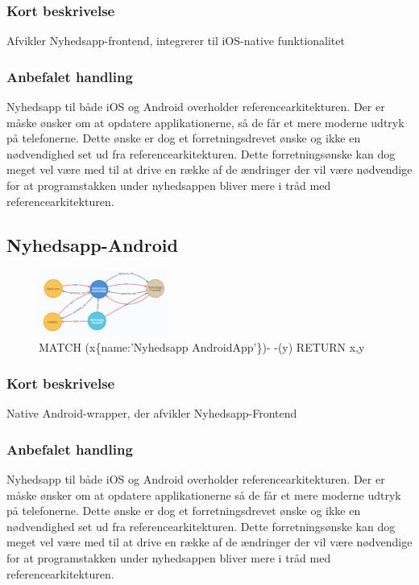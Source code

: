 \documentclass{article}
\begin{document}
\subsubsection{Kort beskrivelse}
Afvikler Nyhedsapp-frontend, integrerer til iOS-native funktionalitet
\subsubsection{Anbefalet handling}
Nyhedsapp til både iOS og Android overholder referencearkitekturen. Der er måske ønsker om at opdatere applikationerne, så de får et mere moderne udtryk på telefonerne. Dette ønske er dog et forretningsdrevet ønske og ikke en nødvendighed set ud fra referencearkitekturen. Dette forretningsønske kan dog meget vel være med til at drive en række af de ændringer der vil være nødvendige for at programstakken under nyhedsappen bliver mere i tråd med referencearkitekturen.


\subsection{Nyhedsapp-Android}
\begin{figure}[h]
\includegraphics[width=120pt]{Nyhedsapp-Android.PNG}
\caption{MATCH (x\{name:'Nyhedsapp AndroidApp'\})- -(y) RETURN x,y}
\end{figure}
\subsubsection{Kort beskrivelse}
Native Android-wrapper, der afvikler Nyhedsapp-Frontend
\subsubsection{Anbefalet handling}
Nyhedsapp til både iOS og Android overholder referencearkitekturen. Der er måske ønsker om at opdatere applikationerne så de får et mere moderne udtryk på telefonerne. Dette ønske er dog et forretningsdrevet ønske og ikke en nødvendighed set ud fra referencearkitekturen. Dette forretningsønske kan dog meget vel være med til at drive en række af de ændringer der vil være nødvendige for at programstakken under nyhedsappen bliver mere i tråd med referencearkitekturen.
\end{document}
